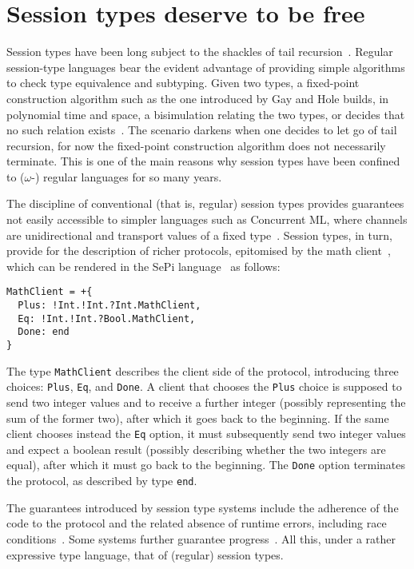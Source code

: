 \section{Session types deserve to be free}

Session types have been long subject to the shackles of tail
recursion~\cite{DBLP:conf/concur/Honda93,DBLP:conf/esop/HondaVK98}. Regular
session-type languages bear the evident advantage of providing
simple algorithms to check type equivalence and subtyping. Given two
types, a fixed-point construction algorithm such as the one introduced
by Gay and Hole builds, in polynomial time and space, a bisimulation
relating the two types, or decides that no such relation
exists~\cite{DBLP:journals/acta/GayH05}. The scenario darkens when one
decides to let go of tail recursion, for now the fixed-point
construction algorithm does not necessarily terminate.
%
This is one of the main reasons why session types have been confined
to ($\omega$-) regular languages for so many years.

The discipline of conventional (that is, regular) session types
provides guarantees not easily accessible to simpler languages such as
Concurrent ML, where channels are unidirectional and transport values
of a fixed type~\cite{DBLP:conf/mcmaster/Reppy93}. Session types, in
turn, provide for the description of richer protocols, epitomised by
the math client~\cite{DBLP:journals/acta/GayH05}, which can be
rendered in the SePi language~\cite{DBLP:conf/sefm/FrancoV13} as
follows:
%
\begin{lstlisting}[morekeywords=end]
MathClient = +{
  Plus: !Int.!Int.?Int.MathClient,
  Eq: !Int.!Int.?Bool.MathClient,
  Done: end
}
\end{lstlisting}

The type \lstinline|MathClient| describes the client side of the protocol,
introducing three choices: \lstinline|Plus|, \lstinline|Eq|, and
\lstinline|Done|. A client that chooses the \lstinline|Plus| choice is
supposed to send two integer values and to receive a further integer
(possibly representing the sum of the former two), after which it goes
back to the beginning. If the same client chooses instead the
\lstinline|Eq| option, it must subsequently send two integer values
and expect a boolean result (possibly describing whether the two
integers are equal), after which it must go back to the beginning.
The \lstinline|Done| option terminates the protocol, as described by
type \lstinline[morekeywords=end]|end|.

The guarantees introduced by session type systems include the
adherence of the code to the protocol and the related absence of
runtime errors, including race
conditions~\cite{DBLP:conf/esop/HondaVK98}. Some systems further
guarantee progress~\cite{DBLP:conf/concur/CairesP10}. All this, under
a rather expressive type language, that of (regular) session types.

